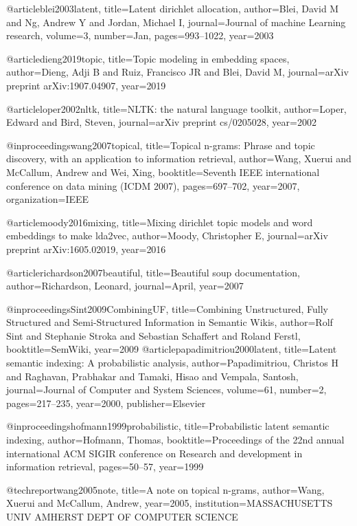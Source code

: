@article{blei2003latent,
  title={Latent dirichlet allocation},
  author={Blei, David M and Ng, Andrew Y and Jordan, Michael I},
  journal={Journal of machine Learning research},
  volume={3},
  number={Jan},
  pages={993--1022},
  year={2003}
}

@article{dieng2019topic,
  title={Topic modeling in embedding spaces},
  author={Dieng, Adji B and Ruiz, Francisco JR and Blei, David M},
  journal={arXiv preprint arXiv:1907.04907},
  year={2019}
}

@article{loper2002nltk,
  title={NLTK: the natural language toolkit},
  author={Loper, Edward and Bird, Steven},
  journal={arXiv preprint cs/0205028},
  year={2002}
}

@inproceedings{wang2007topical,
  title={Topical n-grams: Phrase and topic discovery, with an application to information retrieval},
  author={Wang, Xuerui and McCallum, Andrew and Wei, Xing},
  booktitle={Seventh IEEE international conference on data mining (ICDM 2007)},
  pages={697--702},
  year={2007},
  organization={IEEE}
}

@article{moody2016mixing,
  title={Mixing dirichlet topic models and word embeddings to make lda2vec},
  author={Moody, Christopher E},
  journal={arXiv preprint arXiv:1605.02019},
  year={2016}
}

@article{richardson2007beautiful,
  title={Beautiful soup documentation},
  author={Richardson, Leonard},
  journal={April},
  year={2007}
}

@inproceedings{Sint2009CombiningUF,
  title={Combining Unstructured, Fully Structured and Semi-Structured Information in Semantic Wikis},
  author={Rolf Sint and Stephanie Stroka and Sebastian Schaffert and Roland Ferstl},
  booktitle={SemWiki},
  year={2009}
}
@article{papadimitriou2000latent,
  title={Latent semantic indexing: A probabilistic analysis},
  author={Papadimitriou, Christos H and Raghavan, Prabhakar and Tamaki, Hisao and Vempala, Santosh},
  journal={Journal of Computer and System Sciences},
  volume={61},
  number={2},
  pages={217--235},
  year={2000},
  publisher={Elsevier}
}

@inproceedings{hofmann1999probabilistic,
  title={Probabilistic latent semantic indexing},
  author={Hofmann, Thomas},
  booktitle={Proceedings of the 22nd annual international ACM SIGIR conference on Research and development in information retrieval},
  pages={50--57},
  year={1999}
}

@techreport{wang2005note,
  title={A note on topical n-grams},
  author={Wang, Xuerui and McCallum, Andrew},
  year={2005},
  institution={MASSACHUSETTS UNIV AMHERST DEPT OF COMPUTER SCIENCE}
}

